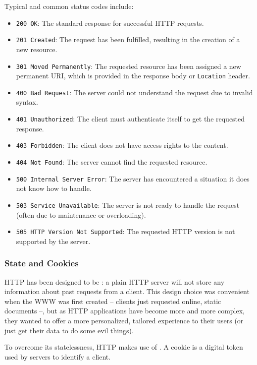 Typical and common status codes include:
\begin{itemize}
    \item \texttt{200 OK}: The standard response for successful HTTP requests.
    \item \texttt{201 Created}: The request has been fulfilled, resulting in the creation of a new resource.
    \item \texttt{301 Moved Permanently}: The requested resource has been assigned a new permanent URI, which is provided in the response body or \texttt{Location} header.
    \item \texttt{400 Bad Request}: The server could not understand the request due to invalid syntax.
    \item \texttt{401 Unauthorized}: The client must authenticate itself to get the requested response.
    \item \texttt{403 Forbidden}: The client does not have access rights to the content.
    \item \texttt{404 Not Found}: The server cannot find the requested resource.
    \item \texttt{500 Internal Server Error}: The server has encountered a situation it does not know how to handle.
    \item \texttt{503 Service Unavailable}: The server is not ready to handle the request (often due to maintenance or overloading).
    \item \texttt{505 HTTP Version Not Supported}: The requested HTTP version is not supported by the server.
\end{itemize}

\subsubsection{State and Cookies}
HTTP has been designed to be : a plain HTTP server will not store any information about past requests from a client.
This design choice was convenient when the WWW was first created -- clients just requested online, static documents --, but as HTTP applications have become more and more complex, they wanted to offer a more personalized, tailored experience to their users (or just get their data to do some evil things). 

To overcome its statelessness, HTTP makes use of .
A cookie is a digital token used by servers to identify a client. 

